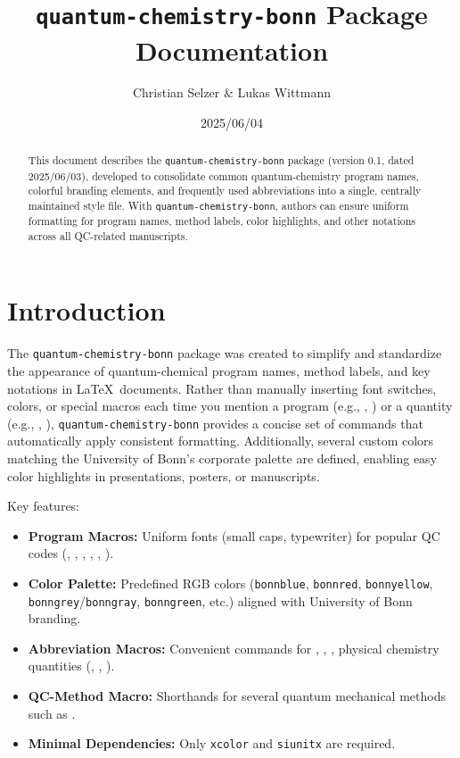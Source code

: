 \documentclass[a4paper,12pt]{article}
\title{\texttt{quantum-chemistry-bonn} Package Documentation}
\author{Christian Selzer \& Lukas Wittmann}
\date{2025/06/04}
\begin{document}
\maketitle

\begin{abstract}
This document describes the \texttt{quantum-chemistry-bonn} package (version 0.1, dated 2025/06/03), developed to consolidate common quantum-chemistry program names, colorful branding elements, and frequently used abbreviations into a single, centrally maintained style file. With \texttt{quantum-chemistry-bonn}, authors can ensure uniform formatting for program names, method labels, color highlights, and other notations across all QC-related manuscripts. 
\end{abstract}

\tableofcontents
\bigskip

\section{Introduction}
The \texttt{quantum-chemistry-bonn} package was created to simplify and standardize the appearance of quantum-chemical program names, method labels, and key notations in \LaTeX\ documents. Rather than manually inserting font switches, colors, or special macros each time you mention a program (e.g., \orca, \xtb) or a quantity (e.g., \pka, \dgsolv), \texttt{quantum-chemistry-bonn} provides a concise set of commands that automatically apply consistent formatting. Additionally, several custom colors matching the University of Bonn’s corporate palette are defined, enabling easy color highlights in presentations, posters, or manuscripts.  

\medskip
Key features:
\begin{itemize}
  \item \textbf{Program Macros:} Uniform fonts (small caps, typewriter) for popular QC codes (\orca, \censo, \draco, \crest, \xtb, \tblite).
  \item \textbf{Color Palette:} Predefined RGB colors (\texttt{bonnblue}, \texttt{bonnred}, \texttt{bonnyellow}, \texttt{bonngrey}/\texttt{bonngray}, \texttt{bonngreen}, etc.) aligned with University of Bonn branding.
  \item \textbf{Abbreviation Macros:} Convenient commands for \etal, \ie, \eg, physical chemistry quantities (\pka, \dgsolv, \kcalpmol).
  \item \textbf{QC-Method Macro:} Shorthands for several quantum mechanical methods such as  .
  \item \textbf{Minimal Dependencies:} Only \texttt{xcolor} and \texttt{siunitx} are required. 
\end{itemize}
\end{document}
